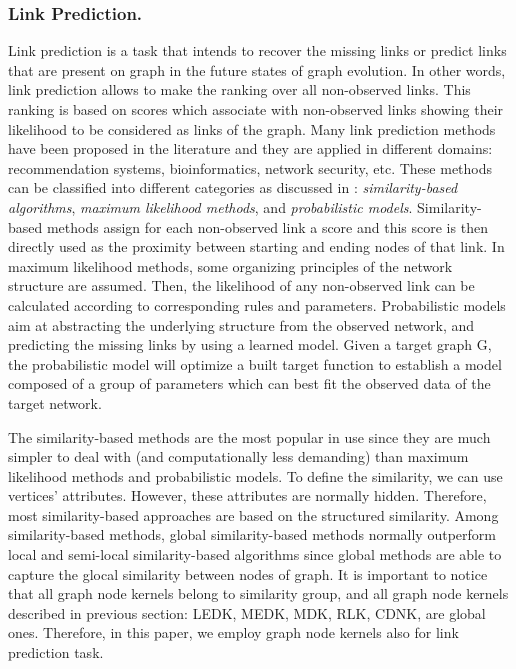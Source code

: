 \subsubsection{Link Prediction.}
\label{link-prediction}
Link prediction is a task that intends to recover the missing links or predict links that are present on graph in the future states of graph evolution. In other words, link prediction allows to make the ranking over all non-observed links. This ranking is based on scores which associate with non-observed links showing their likelihood to be considered as links of the graph. Many link prediction methods have been proposed in the literature and they are applied in different domains: recommendation systems, bioinformatics, network security, etc. These methods can be classified into different categories as discussed in \cite{jour2}: \textit{similarity-based algorithms}, \textit{maximum likelihood methods}, and \textit{probabilistic models}. Similarity-based methods assign for each non-observed link a score and this score is then directly used as the proximity between starting and ending nodes of that link. In maximum likelihood methods, some organizing principles of the network structure are assumed. Then, the likelihood of any non-observed link can be calculated according to corresponding rules and parameters. Probabilistic models aim at abstracting the underlying structure from the observed network, and predicting the missing links by using a learned model. Given a target graph G, the probabilistic model will optimize a built target function to establish a model composed of a group of parameters which can best fit the observed data of the target network.

The similarity-based methods are the most popular in use since they are much simpler to deal with (and computationally less demanding) than maximum likelihood methods and probabilistic models. To define the similarity, we can use vertices' attributes. However, these attributes are normally hidden. Therefore, most similarity-based approaches are based on the structured similarity. Among similarity-based methods, global similarity-based methods normally outperform local and semi-local similarity-based algorithms since global methods are able to capture the glocal similarity between nodes of graph. It is important to notice that all graph node kernels belong to similarity group, and all graph node kernels described in previous section: LEDK, MEDK, MDK, RLK, CDNK, are global ones. Therefore, in this paper, we employ graph node kernels also for link prediction task.